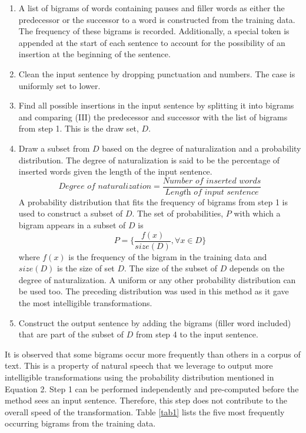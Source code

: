 \documentclass[journal]{IEEEtran}
\begin{document}
\begin{enumerate}
    \item A list of bigrams of words containing pauses and filler words as either the predecessor or the successor to a word is constructed from the training data. The frequency of these bigrams is recorded. Additionally, a special token is appended at the start of each sentence to account for the possibility of an insertion at the beginning of the sentence.
    \item Clean the input sentence by dropping punctuation and numbers. The case is uniformly set to lower. 
    \item Find all possible insertions in the input sentence by splitting it into bigrams and comparing (III) the predecessor and successor with the list of bigrams from step 1. This is the draw set, $D$.
    \item Draw a subset from $D$ based on the degree of naturalization and a probability distribution. The degree of naturalization is said to be the percentage of inserted words given the length of the input sentence.
    \begin{equation}
        \textit{Degree of naturalization} = \frac{\textit{Number of inserted words}}{\textit{Length of input sentence}}
    \end{equation}
    A probability distribution that fits the frequency of bigrams from step 1 is used to construct a subset of $D$. The set of probabilities, $P$ with which a bigram appears in a subset of $D$ is 
    \begin{equation}
        P = \{\frac{f(x)}{size(D)}, \forall x \in D\}
    \end{equation}
    where $f(x)$ is the frequency of the bigram in the training data and $size(D)$ is the size of set $D$. The size of the subset of $D$ depends on the degree of naturalization.
    A uniform or any other probability distribution can be used too. The preceding distribution was used in this method as it gave the most intelligible transformations.  
    \item Construct the output sentence by adding the bigrams (filler word included) that are part of the subset of $D$ from step 4 to the input sentence.
\end{enumerate}

It is observed that some bigrams occur more frequently than others in a corpus of text. This is a property of natural speech that we leverage to output more intelligible transformations using the probability distribution mentioned in Equation 2. Step 1 can be performed independently and pre-computed before the method sees an input sentence. Therefore, this step does not contribute to the overall speed of the transformation. Table \ref{tab1} lists the five most frequently occurring bigrams from the training data.
\end{document}
